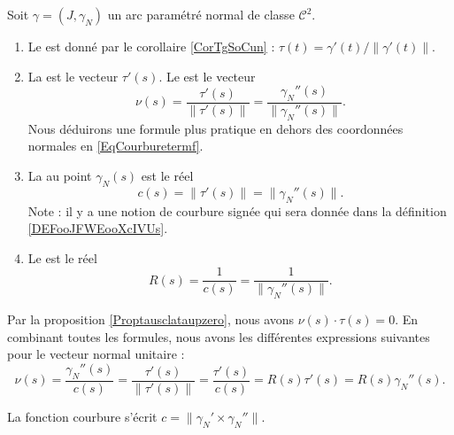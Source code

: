 \begin{definition}      \label{DefCourbureNormleUnit}
    Soit $\gamma=(J,\gamma_N)$ un arc paramétré normal de classe $\mathcal{C}^2$. 
    \begin{enumerate}
        \item
            Le  est donné par le corollaire \ref{CorTgSoCun} : \( \tau(t)=\gamma'(t)/\| \gamma'(t) \|\).
        \item
    La  est le vecteur $\tau'(s)$. Le  est le vecteur
    \begin{equation}
        \nu(s)=\frac{ \tau'(s) }{ \| \tau'(s) \| }=\frac{ \gamma_N''(s) }{ \| \gamma_N''(s) \| }.
    \end{equation}
    Nous déduirons une formule plus pratique en dehors des coordonnées normales en \eqref{EqCourburetermf}.
\item
    La  au point $\gamma_N(s)$ est le réel
    \begin{equation}
        c(s)=\| \tau'(s) \|=\| \gamma_N''(s) \|.
    \end{equation}
    Note : il y a une notion de courbure signée qui sera donnée dans la définition \ref{DEFooJFWEooXcIVUs}.
\item
    Le  est le réel
    \begin{equation}
        R(s)=\frac{1}{ c(s) }=\frac{1}{ \| \gamma_N''(s) \| }.
    \end{equation}
    \end{enumerate}
\end{definition}

Par la proposition \ref{Proptausclataupzero}, nous avons $\nu(s)\cdot\tau(s)=0$. En combinant toutes les formules, nous avons les différentes expressions suivantes pour le vecteur normal unitaire :
\begin{equation}        \label{Eq0908nufractauRc}
    \nu(s)=\frac{ \gamma_N''(s) }{ c(s) }=\frac{ \tau'(s) }{ \| \tau'(s) \| }=\frac{ \tau'(s) }{ c(s) }=R(s)\tau'(s)=R(s)\gamma_N''(s).
\end{equation}

\begin{proposition}
    La fonction courbure s'écrit $c=\| \gamma_N'\times \gamma_N'' \|$.
\end{proposition}

